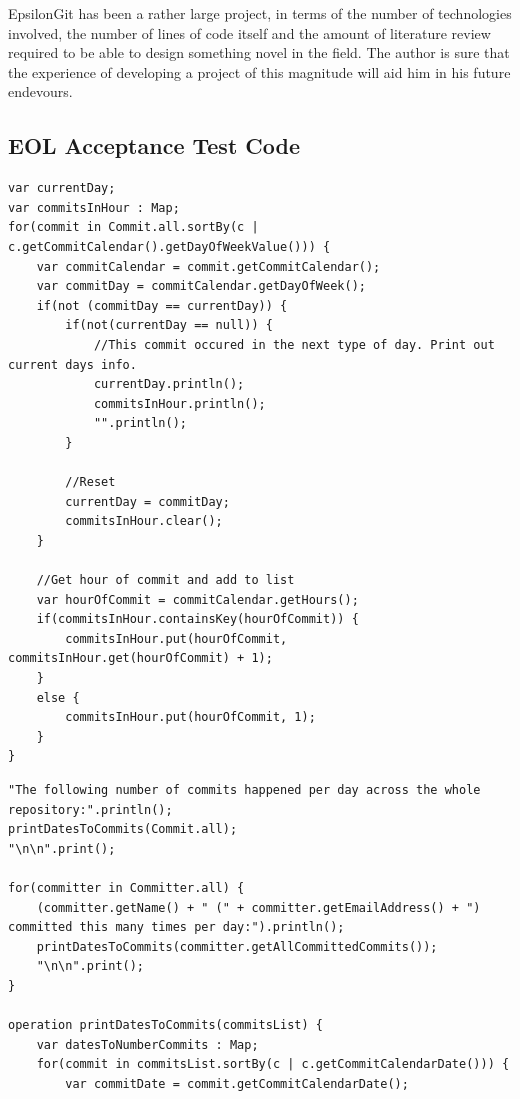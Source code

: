 \documentclass[11pt]{book}
\begin{document}
EpsilonGit has been a rather large project, in terms of the number of technologies involved, the number of lines of code itself and the amount of literature review required to be able to design something novel in the field. The author is sure that the experience of developing a project of this magnitude will aid him in his future endevours.

\printbibliography

\begin{appendices}
\noappendicestocpagenum
\addappheadtotoc
\chapter{EOL Acceptance Test Code}
\label{eolacceptance}

\begin{lstlisting}[caption=Punchcard, label=lst:punchcard]
var currentDay;
var commitsInHour : Map;
for(commit in Commit.all.sortBy(c | c.getCommitCalendar().getDayOfWeekValue())) {
	var commitCalendar = commit.getCommitCalendar();
	var commitDay = commitCalendar.getDayOfWeek();
	if(not (commitDay == currentDay)) {
		if(not(currentDay == null)) {
			//This commit occured in the next type of day. Print out current days info.
			currentDay.println();
			commitsInHour.println();
			"".println();
		}
		
		//Reset
		currentDay = commitDay;
		commitsInHour.clear();
	}
	
	//Get hour of commit and add to list
	var hourOfCommit = commitCalendar.getHours();
	if(commitsInHour.containsKey(hourOfCommit)) {
		commitsInHour.put(hourOfCommit, commitsInHour.get(hourOfCommit) + 1);
	}
	else {
		commitsInHour.put(hourOfCommit, 1);
	}
}
\end{lstlisting}
\clearpage
\begin{lstlisting}[caption=Contribution Dates, label=lst:contributiondates]
"The following number of commits happened per day across the whole repository:".println();
printDatesToCommits(Commit.all);
"\n\n".print();

for(committer in Committer.all) {
	(committer.getName() + " (" + committer.getEmailAddress() + ") committed this many times per day:").println();
	printDatesToCommits(committer.getAllCommittedCommits());
	"\n\n".print();
}

operation printDatesToCommits(commitsList) {  
	var datesToNumberCommits : Map;
	for(commit in commitsList.sortBy(c | c.getCommitCalendarDate())) {
		var commitDate = commit.getCommitCalendarDate();
	

\end{lstlisting}
\end{appendices}
\end{document}
